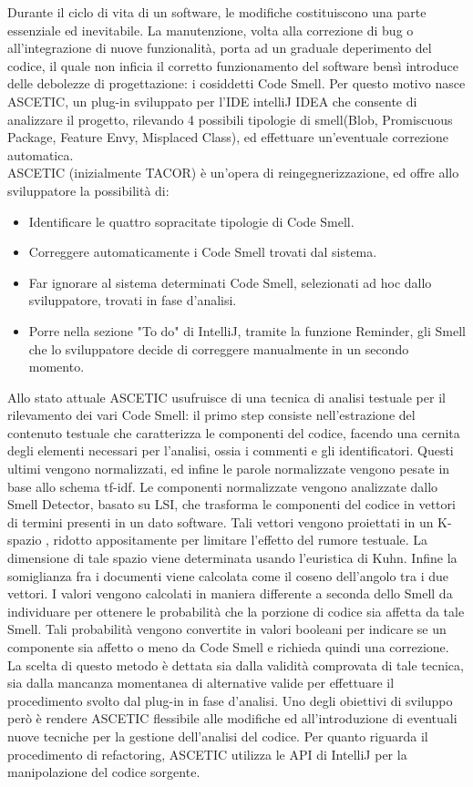 Durante il ciclo di vita di un software, le modifiche costituiscono una parte essenziale ed inevitabile. La manutenzione, volta alla correzione di bug o all'integrazione di nuove funzionalità, porta ad un graduale deperimento del codice, il quale non inficia il corretto funzionamento del software bensì introduce delle debolezze di progettazione: i cosiddetti Code Smell. Per questo motivo nasce ASCETIC, un plug-in sviluppato per l'IDE intelliJ IDEA che consente di analizzare il progetto, rilevando 4 possibili tipologie di smell(Blob, Promiscuous Package, Feature Envy, Misplaced Class), ed effettuare un'eventuale correzione automatica. \\ ASCETIC (inizialmente TACOR) è un'opera di reingegnerizzazione, ed offre allo sviluppatore la possibilità di: 
\begin{itemize}
	\item Identificare le quattro sopracitate tipologie di Code Smell.
	\item Correggere automaticamente i Code Smell trovati dal sistema. 
	\item Far ignorare al sistema determinati Code Smell, selezionati ad hoc dallo sviluppatore, trovati in fase d'analisi. 
	\item Porre nella sezione "To do" di IntelliJ, tramite la funzione Reminder, gli Smell che lo sviluppatore decide di correggere manualmente in un secondo momento. 
\end{itemize}
Allo stato attuale ASCETIC usufruisce di una tecnica di analisi testuale per il rilevamento dei vari Code Smell: il primo step consiste nell'estrazione del contenuto testuale che caratterizza le componenti del codice, facendo una cernita degli elementi necessari per l'analisi, ossia i commenti e gli identificatori. Questi ultimi vengono normalizzati, ed infine le parole normalizzate vengono pesate in base allo schema tf-idf. Le componenti normalizzate vengono analizzate dallo Smell Detector, basato su LSI, che trasforma le componenti del codice in vettori di termini presenti in un dato software.  Tali vettori vengono proiettati in un K-spazio , ridotto appositamente per limitare l'effetto del rumore testuale. La dimensione di tale spazio viene determinata usando l'euristica di Kuhn. Infine la somiglianza fra i documenti viene calcolata come il coseno dell'angolo tra i due vettori. I valori vengono calcolati in maniera differente a seconda dello Smell da individuare per ottenere le probabilità che la porzione di codice sia affetta da tale Smell. Tali probabilità vengono convertite in valori booleani per indicare se un componente sia affetto o meno da Code Smell e richieda quindi una correzione. La scelta di questo metodo è dettata sia dalla validità comprovata di tale tecnica, sia dalla mancanza momentanea di alternative valide per effettuare il procedimento svolto dal plug-in in fase d'analisi. Uno degli obiettivi di sviluppo però è rendere ASCETIC flessibile alle modifiche ed all'introduzione di eventuali nuove tecniche per la gestione dell'analisi del codice. Per quanto riguarda il procedimento di refactoring, ASCETIC utilizza le API di IntelliJ per la manipolazione del codice sorgente. 
